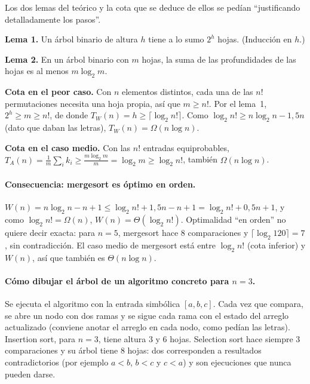 Los dos lemas del teórico y la cota que se deduce de ellos se pedían ``justificando detalladamente los pasos''.

\begin{resultado}
\textbf{Lema 1.} Un árbol binario de altura $h$ tiene a lo sumo $2^h$ hojas. (Inducción en $h$.)

\textbf{Lema 2.} En un árbol binario con $m$ hojas, la suma de las profundidades de las hojas es al menos $m\log_2 m$.

\textbf{Cota en el peor caso.} Con $n$ elementos distintos, cada una de las $n!$ permutaciones necesita una hoja propia, así que $m\ge n!$. Por el lema~1, $2^h\ge m\ge n!$, de donde $T_W(n)=h\ge\lceil\log_2 n!\rceil$. Como $\log_2 n!\ge n\log_2 n-1{,}5n$ (dato que daban las letras), $T_W(n)=\Omega(n\log n)$.

\textbf{Cota en el caso medio.} Con las $n!$ entradas equiprobables, $T_A(n)=\frac1m\sum_i k_i\ge\frac{m\log_2 m}{m}=\log_2 m\ge\log_2 n!$, también $\Omega(n\log n)$.
\end{resultado}

\paragraph{Consecuencia: mergesort es óptimo en orden.} $W(n)=n\log_2 n-n+1\le\log_2 n!+1{,}5n-n+1=\log_2 n!+0{,}5n+1$, y como $\log_2 n!=\Omega(n)$, $W(n)=\Theta(\log_2 n!)$. Optimalidad ``en orden'' no quiere decir exacta: para $n=5$, mergesort hace 8 comparaciones y $\lceil\log_2 120\rceil=7$, sin contradicción. El caso medio de mergesort está entre $\log_2 n!$ (cota inferior) y $W(n)$, así que también es $\Theta(n\log n)$.

\paragraph{Cómo dibujar el árbol de un algoritmo concreto para $n=3$.} Se ejecuta el algoritmo con la entrada simbólica $[a,b,c]$. Cada vez que compara, se abre un nodo con dos ramas y se sigue cada rama con el estado del arreglo actualizado (conviene anotar el arreglo en cada nodo, como pedían las letras). Insertion sort, para $n=3$, tiene altura 3 y 6 hojas. Selection sort hace siempre 3 comparaciones y su árbol tiene 8 hojas: dos corresponden a resultados contradictorios (por ejemplo $a<b$, $b<c$ y $c<a$) y son ejecuciones que nunca pueden darse.

